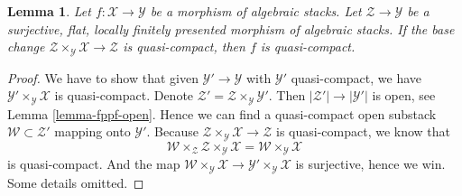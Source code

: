 \documentclass[10pt,a4paper]{amsart}
\theoremstyle{plain}
\newtheorem{lemma}[subsection]{Lemma}
\theoremstyle{definition}
\theoremstyle{remark}
\numberwithin{equation}{subsection}
\begin{document}
\begin{lemma}
\label{lemma-descent-quasi-compact}
Let $f : \mathcal{X} \to \mathcal{Y}$ be a morphism of algebraic stacks.
Let $\mathcal{Z} \to \mathcal{Y}$ be a surjective, flat, locally finitely
presented morphism of algebraic stacks. If the base change
$\mathcal{Z} \times_\mathcal{Y} \mathcal{X} \to \mathcal{Z}$
is quasi-compact, then $f$ is quasi-compact.
\end{lemma}

\begin{proof}
We have to show that given $\mathcal{Y}' \to \mathcal{Y}$
with $\mathcal{Y}'$ quasi-compact, we have
$\mathcal{Y}' \times_\mathcal{Y} \mathcal{X}$ is quasi-compact.
Denote $\mathcal{Z}' = \mathcal{Z} \times_\mathcal{Y} \mathcal{Y}'$.
Then $|\mathcal{Z}'| \to |\mathcal{Y}'|$ is open, see
Lemma \ref{lemma-fppf-open}. Hence we can find a quasi-compact
open substack $\mathcal{W} \subset \mathcal{Z}'$ mapping onto
$\mathcal{Y}'$. Because
$\mathcal{Z} \times_\mathcal{Y} \mathcal{X} \to \mathcal{Z}$
is quasi-compact, we know that
$$
\mathcal{W} \times_\mathcal{Z} \mathcal{Z} \times_\mathcal{Y} \mathcal{X} =
\mathcal{W} \times_\mathcal{Y} \mathcal{X}
$$
is quasi-compact. And the map
$\mathcal{W} \times_\mathcal{Y} \mathcal{X} \to
\mathcal{Y}' \times_\mathcal{Y} \mathcal{X}$
is surjective, hence we win. Some details omitted.
\end{proof}
\end{document}
